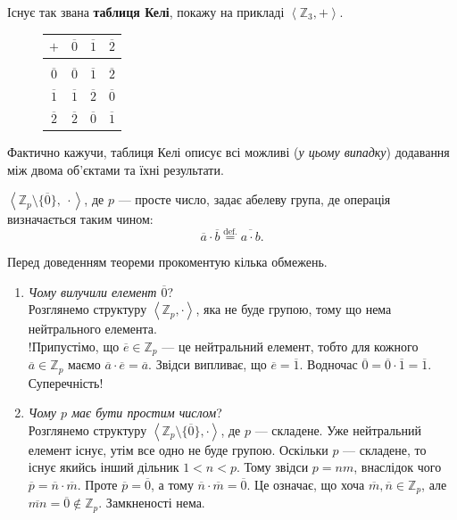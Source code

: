 \documentclass{math_library}
\begin{document}
\begin{example}
Існує так звана \textbf{таблиця Келі}, покажу на прикладі $\left<\mathbb{Z}_3,+ \right>$.
\begin{figure}[H]
\centering
\begin{tabular}{c|ccc}
$+$ & $\overline{0}$ & $\overline{1}$ & $\overline{2}$ \\ 
\hline \\ [-9pt]
$\overline{0}$ & $\overline{0}$ & $\overline{1}$ & $\overline{2}$ \\ 
$\overline{1}$ & $\overline{1}$ & $\overline{2}$ & $\overline{0}$ \\
$\overline{2}$ & $\overline{2}$ & $\overline{0}$ & $\overline{1}$ \\
\end{tabular}
\end{figure}
Фактично кажучи, таблиця Келі описує всі можливі (\textit{у цьому випадку}) додавання між двома об'єктами та їхні результати.
\end{example}

\begin{theorem}
\label{multiplicative_class_of_residues_mod_n_is_a_group}
$\left< \mathbb{Z}_p \setminus \{\overline{0}\},\ \cdot \right>$, де $p$ --- просте число, задає абелеву група, де операція визначається таким чином: \[
\overline{a} \cdot \overline{b} \overset{\text{def.}}{=} \overline{a \cdot b}. \]
\end{theorem}

Перед доведенням теореми прокоментую кілька обмежень.
\begin{enumerate}[wide=0pt,label={\Roman*.}]
\item \textit{Чому вилучили елемент $\overline{0}$}?\\
Розглянемо структуру $\left< \mathbb{Z}_p, \cdot \right>$, яка не буде групою, тому що нема нейтрального елемента.\\
!Припустімо, що $\overline{e} \in \mathbb{Z}_p$ --- це нейтральний елемент, тобто для кожного $\overline{a} \in \mathbb{Z}_p$ маємо $\overline{a} \cdot \overline{e} = \overline{a}$. Звідси випливає, що $\overline{e} = \overline{1}$. Водночас $\overline{0} = \overline{0} \cdot \overline{1} = \overline{1}$. Суперечність!

\item \textit{Чому $p$ має бути простим числом}?\\
Розглянемо структуру $\left<\mathbb{Z}_p \setminus \{\overline{0}\}, \cdot \right>$, де $p$ --- складене. Уже нейтральний елемент існує, утім все одно не буде групою. Оскільки $p$ --- складене, то існує якийсь інший дільник $1 < n < p$. Тому звідси $p = nm$, внаслідок чого $\overline{p} = \overline{n} \cdot \overline{m}$. Проте $\overline{p} = \overline{0}$, а тому $\overline{n}\cdot \overline{m} = \overline{0}$. Це означає, що хоча $\overline{m}, \overline{n} \in \mathbb{Z}_p$, але $\overline{mn} = \overline{0} \not\in \mathbb{Z}_p$. Замкненості нема.
\end{enumerate}
\end{document}
